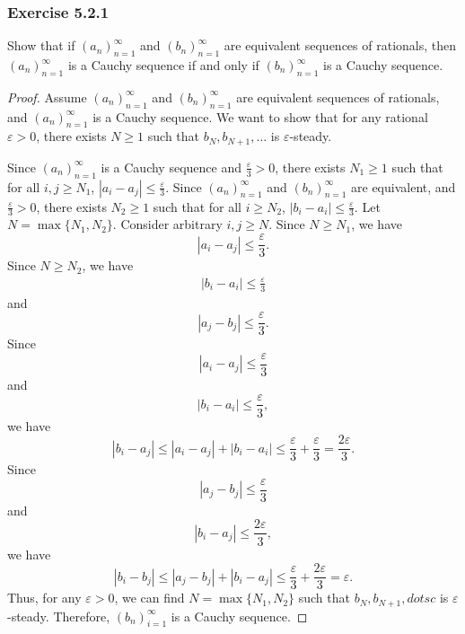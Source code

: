 \documentclass[12pt, letter]{article}
\begin{document}
\subsubsection*{Exercise 5.2.1}
Show that if $(a_n)_{n=1}^\infty$ and $(b_n)_{n=1}^\infty$ are equivalent sequences of rationals, then $(a_n)_{n=1}^\infty$ is a Cauchy sequence if and only if $(b_n)_{n=1}^\infty$
is a Cauchy sequence.
\begin{proof}
    Assume $(a_n)_{n=1}^\infty$ and $(b_n)_{n=1}^\infty$ are equivalent sequences of rationals, and $(a_n)_{n=1}^\infty$ is a Cauchy sequence. We want to show that for any rational 
    $\varepsilon>0$, there exists $N\geq 1$ such that $b_N,b_{N+1},\dotsc$ is $\varepsilon$-steady. 

    Since $(a_n)_{n=1}^\infty$ is a Cauchy sequence and $\frac{\varepsilon}{3}>0$, there exists $N_1\geq 1$ such that for all $i,j\geq N_1$, $|a_i-a_j|\leq \frac{\varepsilon}{3}$.
    Since $(a_n)_{n=1}^\infty$ and $(b_n)_{n=1}^\infty$ are equivalent, and $\frac{\varepsilon}{3}>0$, there exists $N_2\geq 1$ such that for all $i\geq N_2$, $|b_i-a_i|\leq\frac{\varepsilon}{3}$.
    Let $N=\max\{N_1,N_2\}$. Consider arbitrary $i,j\geq N$. Since $N\geq N_1$, we have 
    \begin{equation*}
        |a_i-a_j|\leq \frac{\varepsilon}{3}.
    \end{equation*}
    Since $N\geq N_2$, we have
    \begin{equation*}
        \begin{gathered}
            |b_i-a_i|\leq\frac{\varepsilon}{3}
        \end{gathered}
    \end{equation*}
    and 
    \begin{equation*}
        |a_j-b_j|\leq \frac{\varepsilon}{3}.
    \end{equation*}
    Since 
    \begin{equation*}
        |a_i-a_j|\leq \frac{\varepsilon}{3}
    \end{equation*}
    and 
    \begin{equation*}
        |b_i-a_i|\leq\frac{\varepsilon}{3},
    \end{equation*}
    we have 
    \begin{equation*}
        |b_i-a_j|\leq |a_i-a_j|+|b_i-a_i|\leq\frac{\varepsilon}{3}+\frac{\varepsilon}{3}=\frac{2\varepsilon}{3}.
    \end{equation*}
    Since 
    \begin{equation*}
        |a_j-b_j|\leq \frac{\varepsilon}{3}
    \end{equation*}
    and 
    \begin{equation*}
        |b_i-a_j|\leq\frac{2\varepsilon}{3},
    \end{equation*}
    we have 
    \begin{equation*}
        |b_i-b_j|\leq|a_j-b_j|+|b_i-a_j|\leq\frac{\varepsilon}{3}+\frac{2\varepsilon}{3}=\varepsilon.
    \end{equation*}
    Thus, for any $\varepsilon>0$, we can find $N=\max\{N_1,N_2\}$ such that $b_N,b_{N+1},dotsc$ is $\varepsilon$-steady. Therefore, $(b_n)_{i=1}^\infty$
    is a Cauchy sequence. 


\end{proof}
\end{document}
